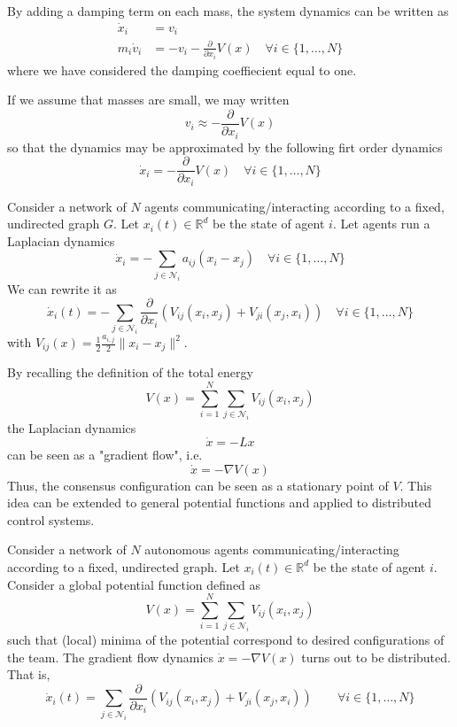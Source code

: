 \documentclass{book}
\newcommand{\R}{\mathbb{R}}
\theoremstyle{theoremv2}
\theoremstyle{defv2}
\theoremstyle{remark}
\theoremstyle{remark}
\theoremstyle{definition}
\theoremstyle{definition}
\begin{document}
By adding a damping term on each mass, the system dynamics can be written as 
\begin{align*}
    \dot{x}_i &= v_i\\
    m_i\dot{v}_i &= -v_i - \displaystyle\frac{\partial}{\partial x_i}V(x) \quad \forall i \in \{ 1,\dots,N \}
\end{align*}
where we have considered the damping coeffiecient equal to one. 

If we assume that masses are small, we may written
\[
    v_i \approx - \displaystyle\frac{\partial}{\partial x_i} V(x)
\]
so that the dynamics may be approximated by the following firt order dynamics
\[
    \dot{x}_i = - \displaystyle\frac{\partial}{\partial x_i}V(x) \quad \forall i\in\{ 1,\dots,N \}
\]

Consider a network of $N$ agents communicating/interacting according to a fixed, undirected graph $G$. Let $x_i(t)\in\R^d$ be the state of agent $i$. Let agents run a Laplacian dynamics
\[
    \dot{x}_i = - \displaystyle\sum_{j\in\mathcal{N}_i}a_{ij}(x_i-x_j) \quad \forall i\in\{ 1,\dots,N \}
\]
We can rewrite it as 
\[
    \dot{x}_i(t) = - \displaystyle\sum_{j\in \mathcal{N}_i} \displaystyle\frac{\partial}{\partial x_i}\left(V_{ij}(x_i,x_j)+V_{ji}(x_j,x_i)\right) \quad \forall i \in \{ 1,\dots,N \}
\]
with $V_{ij}(x) = \displaystyle\frac{1}{2}\displaystyle\frac{a_{i,j}}{2}\|x_i-x_j\|^2$.

By recalling the definition of the total energy
\[
    V(x)=\displaystyle\sum_{i=1}^{N}\displaystyle\sum_{j\in\mathcal{N}_i}V_{ij}(x_i,x_j)
\]
the Laplacian dynamics 
\[
    \dot{x} = -Lx
\]
can be seen as a "gradient flow", i.e. 
\[
    \dot{x} = -\nabla V(x)
\]
Thus, the consensus configuration can be seen as a stationary point of $V$. This idea can be extended to general potential functions and applied to distributed control systems.

Consider a network of $N$ autonomous agents communicating/interacting according to a fixed, undirected graph. Let $x_i(t)\in\R^d$ be the state of agent $i$. Consider a global potential function defined as 
\[
    V(x)=\displaystyle\sum_{i=1}^{N}\displaystyle\sum_{j\in\mathcal{N}_i}V_{ij}(x_i,x_j)
\]
such that (local) minima of the potential correspond to desired configurations of the team. The gradient flow dynamics $\dot{x} = -\nabla V(x)$ turns out to be distributed. That is,
 \[
     \dot{x}_i(t) = \displaystyle\sum_{j\in\mathcal{N}_i}\displaystyle\frac{\partial}{\partial x_i}\left(V_{ij}(x_i,x_j)+V_{ji}(x_j,x_i)\right) \qquad \forall i \in \{ 1,\dots,N \}
 \]
\end{document}
